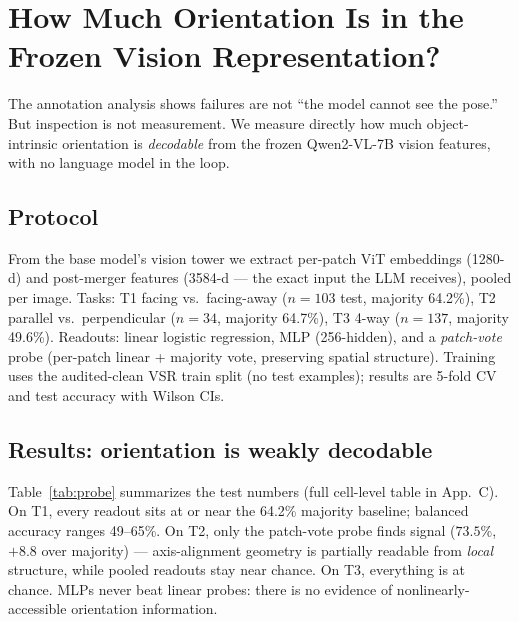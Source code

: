 \section{How Much Orientation Is in the Frozen Vision Representation?}
\label{sec:probes}

The annotation analysis shows failures are not ``the model cannot see the
pose.'' But inspection is not measurement. We measure directly how much
object-intrinsic orientation is \emph{decodable} from the frozen Qwen2-VL-7B
vision features, with no language model in the loop.

\subsection{Protocol}
From the base model's vision tower we extract per-patch ViT embeddings (1280-d)
and post-merger features (3584-d --- the exact input the LLM receives), pooled
per image. Tasks: T1 facing vs.\ facing-away ($n{=}103$ test, majority 64.2\%),
T2 parallel vs.\ perpendicular ($n{=}34$, majority 64.7\%), T3 4-way
($n{=}137$, majority 49.6\%). Readouts: linear logistic regression, MLP
(256-hidden), and a \emph{patch-vote} probe (per-patch linear + majority vote,
preserving spatial structure). Training uses the audited-clean VSR train split
(no test examples); results are 5-fold CV and test accuracy with Wilson CIs.

\subsection{Results: orientation is weakly decodable}
Table~\ref{tab:probe} summarizes the test numbers (full cell-level table in
App.~C). On T1, every readout sits at or near the 64.2\% majority
baseline; balanced accuracy ranges 49--65\%. On T2, only the patch-vote probe
finds signal ($73.5\%$, $+8.8$ over majority) --- axis-alignment geometry is
partially readable from \emph{local} structure, while pooled readouts stay near
chance. On T3, everything is at chance. MLPs never beat linear probes: there is
no evidence of nonlinearly-accessible orientation information.

